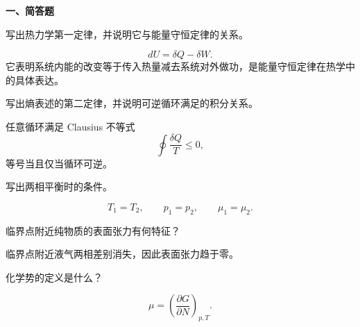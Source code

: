﻿


\textbf{一、简答题}
\begin{question}
写出热力学第一定律，并说明它与能量守恒定律的关系。
\begin{solution}

\[
dU=\delta Q-\delta W.
\]
它表明系统内能的改变等于传入热量减去系统对外做功，是能量守恒定律在热学中的具体表达。
\end{solution}
\end{question}

\begin{question}
写出熵表述的第二定律，并说明可逆循环满足的积分关系。
\begin{solution}

任意循环满足 Clausius 不等式
\[
\oint\frac{\delta Q}{T}\le0,
\]
等号当且仅当循环可逆。
\end{solution}
\end{question}

\begin{question}
写出两相平衡时的条件。
\begin{solution}

\[
T_1=T_2,\qquad p_1=p_2,\qquad \mu_1=\mu_2.
\]
\end{solution}
\end{question}

\begin{question}
临界点附近纯物质的表面张力有何特征？
\begin{solution}

临界点附近液气两相差别消失，因此表面张力趋于零。


\end{solution}
\end{question}

\begin{question}
化学势的定义是什么？
\begin{solution}

\[
\mu=\left(\frac{\partial G}{\partial N}\right)_{p,T}.
\]
\end{solution}
\end{question}

